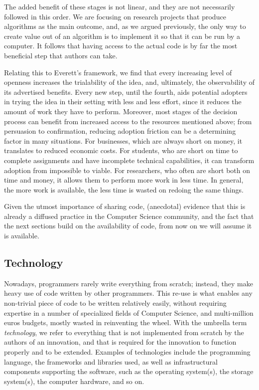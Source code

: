 \documentclass[12pt]{article}
\begin{document}
The added benefit of these stages is not linear, and they are not necessarily followed in this order. We are focusing on research projects that produce algorithms as the main outcome, and, as we argued previously, the only way to create value out of an algorithm is to implement it so that it can be run by a computer. It follows that having access to the actual code is by far the most beneficial step that authors can take.

Relating this to Everett's framework, we find that every increasing level of openness increases the trialability of the idea, and, ultimately, the observability of its advertised benefits. Every new step, until the fourth, aids potential adopters in trying the idea in their setting with less and less effort, since it reduces the amount of work they have to perform. Moreover, most stages of the decision process can benefit from increased access to the resources mentioned above; from persuasion to confirmation, reducing adoption friction can be a determining factor in many situations. For businesses, which are always short on money, it translates to reduced economic costs. For students, who are short on time to complete assignments and have incomplete technical capabilities, it can transform adoption from impossible to viable. For researchers, who often are short both on time and money, it allows them to perform more work in less time. In general, the more work is available, the less time is wasted on redoing the same things.

Given the utmost importance of sharing code, (anecdotal) evidence that this is already a diffused practice in the Computer Science community, and the fact that the next sections build on the availability of code, from now on we will assume it is available.

\subsection{Technology}
\label{sec:org2d6d04b}
Nowadays, programmers rarely write everything from scratch; instead, they make heavy use of code written by other programmers. This re-use is what enables any non-trivial piece of code to be written relatively easily, without requiring expertise in a number of specialized fields of Computer Science, and multi-million euros budgets, mostly wasted in reinventing the wheel. With the umbrella term \emph{technology}, we refer to everything that is not implemented from scratch by the authors of an innovation, and that is required for the innovation to function properly and to be extended. Examples of technologies include the programming language, the frameworks and libraries used, as well as infrastructural components supporting the software, such as the operating system(s), the storage system(s), the computer hardware, and so on.
\end{document}
